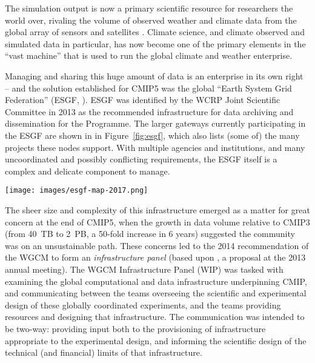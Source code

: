 \documentclass[gmd,manuscript]{copernicus}
\newcommand{\pipref}[1] {\citep{ref:#1}}
\newcommand{\figref}[1] {\mbox{Figure   \ref{fig:#1}}}
\begin{document}
The simulation output is now a primary scientific resource for
researchers the world over, rivaling the volume of observed weather
and climate data from the global array of sensors and satellites
\pipref{overpecketal2011}. Climate science, and climate observed and
simulated data in particular, has now become one of the primary
elements in the ``vast machine'' \pipref{edwards2010} that is used to
run the global climate and weather enterprise.

Managing and sharing this huge amount of data is an enterprise in its
own right -- and the solution established for CMIP5 was the global
``Earth System Grid Federation'' (ESGF, \pipref{williamsetal2015}).
ESGF was identified by the WCRP Joint Scientific Committee in 2013 as
the recommended infrastructure for data archiving and dissemination
for the Programme. The larger gateways currently participating in the
ESGF are shown in in \figref{esgf}, which also lists (some of) the
many projects these nodes support. With multiple agencies and
institutions, and many uncoordinated and possibly conflicting
requirements, the ESGF itself is a complex and delicate component to
manage.

\begin{figure*}
  \begin{center}
    \texttt{[image: images/esgf-map-2017.png]}
  \end{center}
  \caption{Sites participating in the Earth System Grid Federation in
    2017. Figure courtesy Dean Williams, adapted from the ESGF
    Brochure. }
  \label{fig:esgf}
\end{figure*}

The sheer size and complexity of this infrastructure emerged as a
matter for great concern at the end of CMIP5, when the growth in data
volume relative to CMIP3 (from 40~TB to 2~PB, a 50-fold increase in 6
years) suggested the community was on an unsustainable path. These
concerns led to the 2014 recommendation of the WGCM to form an
\emph{infrastructure panel} (based upon \href{https://goo.gl/FHqbNN},
a proposal at the 2013 annual meeting). The WGCM Infrastructure Panel
(WIP) was tasked with examining the global computational and data
infrastructure underpinning CMIP, and communicating between the teams
overseeing the scientific and experimental design of these globally
coordinated experiments, and the teams providing resources and
designing that infrastructure. The communication was intended to be
two-way: providing input both to the provisioning of infrastructure
appropriate to the experimental design, and informing the scientific
design of the technical (and financial) limits of that infrastructure.
\end{document}
